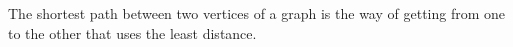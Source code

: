 The shortest path between two vertices of a graph is the way of getting
from one to the other that uses the least distance.